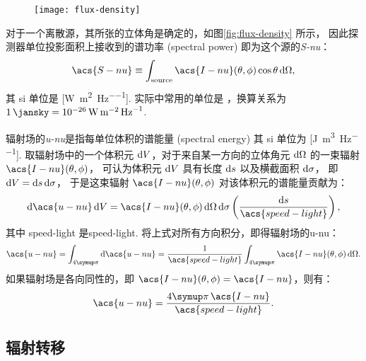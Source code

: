 \begin{figure}[htp]
  \centering
  \texttt{[image: flux-density]}
  \label{fig:flux-density}
\end{figure}

对于一个离散源，其所张的立体角是确定的，如图\autoref{fig:flux-density} 所示，
因此探测器单位投影面积上接收到的谱功率 (spectral power)
即为这个源的\emph{\acf{S-nu}}：
\begin{equation}
  \label{eq:flux-density}
  \acs{S-nu} \equiv
    \int_{\R{source}} \acs{I-nu}(\theta,\phi) \cos\theta \,\D{\Omega} ,
\end{equation}
其 \ac{si} 单位是 [\si{\watt\per\square\meter\per\hertz}].
实际中常用的单位是 \si{\jansky}，换算关系为
$\SI{1}{\jansky} = \SI{e-26}{\watt\per\square\meter\per\hertz}$.

辐射场的\emph{\acf{u-nu}}是指每单位体积的谱能量 (spectral energy)
其 \ac{si} 单位为 [\si{\joule\per\cubic\meter\per\hertz}].
取辐射场中的一个体积元 $\mathrm{d}V$，对于来自某一方向的立体角元 $\mathrm{d}\Omega$
的一束辐射 $\acs{I-nu}(\theta,\phi)$，
可认为体积元 $\mathrm{d}V$ 具有长度 $\mathrm{d}s$ 以及横截面积 $\mathrm{d}\sigma$，
即 $\mathrm{d}V = \mathrm{d}s\,\mathrm{d}\sigma$，
于是这束辐射 $\acs{I-nu}(\theta,\phi)$ 对该体积元的谱能量贡献为：
\begin{equation}
  \D{\acs{u-nu}}\,\D{V}
    = \acs{I-nu}(\theta,\phi) \,\D{\Omega}\,\D{\sigma}
      \left( \frac{\D{s}}{\acs{speed-light}} \right) ,
\end{equation}
其中 \acs{speed-light} 是\acl{speed-light}.
将上式对所有方向积分，即得辐射场的\acl{u-nu}：
\begin{equation}
  \label{eq:spectral-energy-density}
  \acs{u-nu}
    = \int_{4\Cpi} \D{\acs{u-nu}}
    = \frac{1}{\acs{speed-light}}
      \int_{4\Cpi} \acs{I-nu}(\theta,\phi) \,\D{\Omega} .
\end{equation}
如果辐射场是各向同性的，即 $\acs{I-nu}(\theta,\phi) = \acs{I-nu}$，则有：
\begin{equation}
  \label{eq:spectral-energy-density-iso}
  \acs{u-nu} = \frac{4\Cpi \, \acs{I-nu}}{\acs{speed-light}} .
\end{equation}

\subsection{辐射转移}
\label{sec:radiative-transfer}

